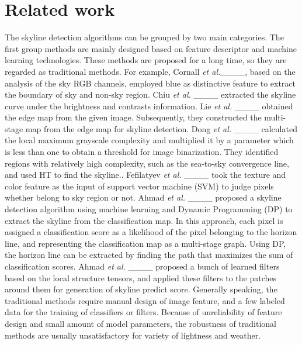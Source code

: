 \section{Related work}
\IEEEpubidadjcol
The skyline detection algorithms can be grouped by two main categories. The first group methods are mainly designed based on feature descriptor and machine learning technologies. These methods are proposed for a long time, so they are regarded as traditional methods. For example, Cornall \textit{et al.}____, based on the analysis of the sky RGB channels, employed blue as distinctive feature to extract the boundary of sky and non-sky region. Chiu \textit{et al.} ____ extracted the skyline curve under the brightness and contrasts information. Lie \textit{et al.} ____ obtained the edge map from the given image. Subsequently, they constructed the multi-stage map from the edge map for skyline detection. Dong \textit{et al.} ____ calculated the local maximum grayscale complexity and multiplied it by a parameter which is less than one to obtain a threshold for image binarization. They identified regions with relatively high complexity, such as the sea-to-sky convergence line, and used HT to find the skyline.. Fefilatyev \textit{et al.} ____ took the texture and color feature as the input of support vector machine (SVM) to judge pixels whether belong to sky region or not. Ahmad \textit{et al.} ____ proposed a skyline detection algorithm using machine learning and Dynamic Programming (DP) to extract the skyline from the classification map. In this approach, each pixel is assigned a classification score as a likelihood of the pixel belonging to the horizon line, and representing the classification map as a multi-stage graph. Using DP, the horizon line can be extracted by finding the path that maximizes the sum of classification scores. Ahmad \textit{et al.} ____ proposed a bunch of learned filters based on the local structure tensors, and applied these filters to the patches around them for generation of skyline predict score. Generally speaking, the traditional methods require manual design of image feature, and a few labeled data for the training of classifiers or filters. Because of  unreliability of feature design and small amount of model parameters, the robustness of traditional methods are usually unsatisfactory for variety of lightness and weather. 
